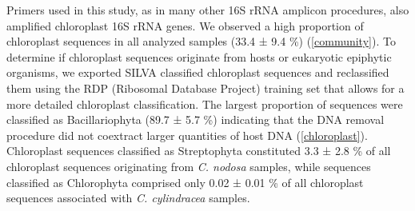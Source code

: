 \documentclass[
  12pt,
]{article}
\begin{document}
Primers used in this study, as in many other 16S rRNA amplicon
procedures, also amplified chloroplast 16S rRNA genes. We observed a
high proportion of chloroplast sequences in all analyzed samples (33.4 ±
9.4 \si{\percent}) (\autoref{community}). To determine if chloroplast
sequences originate from hosts or eukaryotic epiphytic organisms, we
exported SILVA classified chloroplast sequences and reclassified them
using the RDP (Ribosomal Database Project) training set that allows for
a more detailed chloroplast classification. The largest proportion of
sequences were classified as Bacillariophyta (89.7 ± 5.7 \si{\percent})
indicating that the DNA removal procedure did not coextract larger
quantities of host DNA (\autoref{chloroplast}). Chloroplast sequences
classified as Streptophyta constituted 3.3 ± 2.8 \si{\percent} of all
chloroplast sequences originating from \emph{C. nodosa} samples, while
sequences classified as Chlorophyta comprised only 0.02 ± 0.01
\si{\percent} of all chloroplast sequences associated with \emph{C.
cylindracea} samples.
\end{document}
